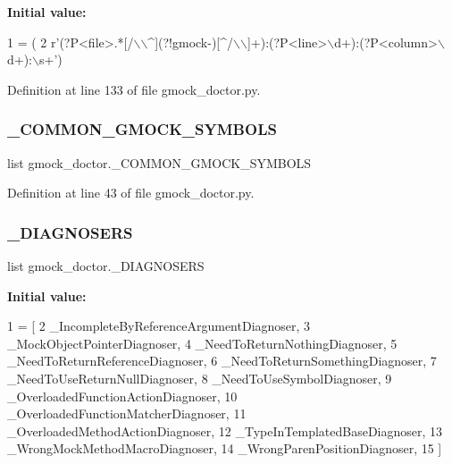 {\bfseries Initial value\+:}
\begin{DoxyCode}
1 =  (
2     \textcolor{stringliteral}{r'(?P<file>.*[/\(\backslash\)\(\backslash\)^](?!gmock-)[^/\(\backslash\)\(\backslash\)]+):(?P<line>\(\backslash\)d+):(?P<column>\(\backslash\)d+):\(\backslash\)s+'})
\end{DoxyCode}


Definition at line 133 of file gmock\+\_\+doctor.\+py.

\mbox{\label{namespacegmock__doctor_ac704a49399e603fba5104e490f17fce3}} 
\subsubsection{\texorpdfstring{\+\_\+\+C\+O\+M\+M\+O\+N\+\_\+\+G\+M\+O\+C\+K\+\_\+\+S\+Y\+M\+B\+O\+LS}{\_COMMON\_GMOCK\_SYMBOLS}}
{\footnotesize\ttfamily list gmock\+\_\+doctor.\+\_\+\+C\+O\+M\+M\+O\+N\+\_\+\+G\+M\+O\+C\+K\+\_\+\+S\+Y\+M\+B\+O\+LS\hspace{0.3cm}{\ttfamily [private]}}



Definition at line 43 of file gmock\+\_\+doctor.\+py.

\mbox{\label{namespacegmock__doctor_ad8d4f979dbf1b3c8edb226d124571b4e}} 
\subsubsection{\texorpdfstring{\+\_\+\+D\+I\+A\+G\+N\+O\+S\+E\+RS}{\_DIAGNOSERS}}
{\footnotesize\ttfamily list gmock\+\_\+doctor.\+\_\+\+D\+I\+A\+G\+N\+O\+S\+E\+RS\hspace{0.3cm}{\ttfamily [private]}}

{\bfseries Initial value\+:}
\begin{DoxyCode}
1 =  [
2     \_IncompleteByReferenceArgumentDiagnoser,
3     \_MockObjectPointerDiagnoser,
4     \_NeedToReturnNothingDiagnoser,
5     \_NeedToReturnReferenceDiagnoser,
6     \_NeedToReturnSomethingDiagnoser,
7     \_NeedToUseReturnNullDiagnoser,
8     \_NeedToUseSymbolDiagnoser,
9     \_OverloadedFunctionActionDiagnoser,
10     \_OverloadedFunctionMatcherDiagnoser,
11     \_OverloadedMethodActionDiagnoser,
12     \_TypeInTemplatedBaseDiagnoser,
13     \_WrongMockMethodMacroDiagnoser,
14     \_WrongParenPositionDiagnoser,
15     ]
\end{DoxyCode}


